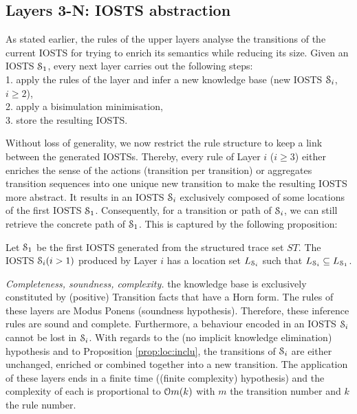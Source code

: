 \subsection{Layers 3-N: IOSTS abstraction}
\label{sec:modelinf:webapps:L4}

As stated earlier, the rules of the upper layers analyse the
transitions of the current IOSTS for trying to enrich its
semantics while reducing its size. Given an IOSTS
$\EuScript{S}_1$, every next layer carries out the following
steps:\\
1. apply the rules of the layer and infer a new knowledge base
(new IOSTS $\EuScript{S}_i$, $i\geq 2$),\\
2. apply a bisimulation minimisation,\\
3. store the resulting IOSTS.

Without loss of generality, we now restrict the rule structure to
keep a link between the generated IOSTSs. Thereby, every rule of
Layer $i$ ($i \geq 3$) either enriches the sense of the actions
(transition per transition) or aggregates transition sequences
into one unique new transition to make the resulting IOSTS more
abstract. It results in an IOSTS $\EuScript{S}_i$ exclusively
composed of some locations of the first IOSTS $\EuScript{S}_1$.
Consequently, for a transition or path of $\EuScript{S}_i$, we
can still retrieve the concrete path of $\EuScript{S}_1$. This
is captured by the following proposition:

\begin{proposition}
\label{prop:loc:inclu}

Let $\EuScript{S}_1$ be the first IOSTS generated from the
structured trace set $ST$. The IOSTS $\EuScript{S}_i (i>1)$
produced by Layer $i$ has a location set $L_{\EuScript{S}_i}$
such that $L_{\EuScript{S}_i} \subseteq L_{\EuScript{S}_1}$.
\end{proposition}

\textit{Completeness, soundness, complexity.} the knowledge base
is exclusively constituted by (positive) Transition facts that
have a Horn form. The rules of these layers are Modus Ponens
(soundness hypothesis). Therefore, these inference rules are
sound and complete. Furthermore, a behaviour encoded in an IOSTS
$\EuScript{S}_i$ cannot be lost in $\EuScript{S}_i$. With regards
to the (no implicit knowledge elimination) hypothesis and to
Proposition \ref{prop:loc:inclu}, the transitions of
$\EuScript{S}_i$ are either unchanged, enriched or combined
together into a new transition. The application of these layers
ends in a finite time ((finite complexity) hypothesis) and the
complexity of each is proportional to $\EuScript{O}m(k)$ with $m$
the transition number and $k$ the rule number.


